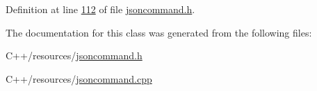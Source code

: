 Definition at line \hyperlink{jsoncommand_8h_source_l00112}{112} of file \hyperlink{jsoncommand_8h_source}{jsoncommand.\-h}.



The documentation for this class was generated from the following files\-:\begin{DoxyCompactItemize}
\item 
C++/resources/\hyperlink{jsoncommand_8h}{jsoncommand.\-h}\item 
C++/resources/\hyperlink{jsoncommand_8cpp}{jsoncommand.\-cpp}\end{DoxyCompactItemize}
